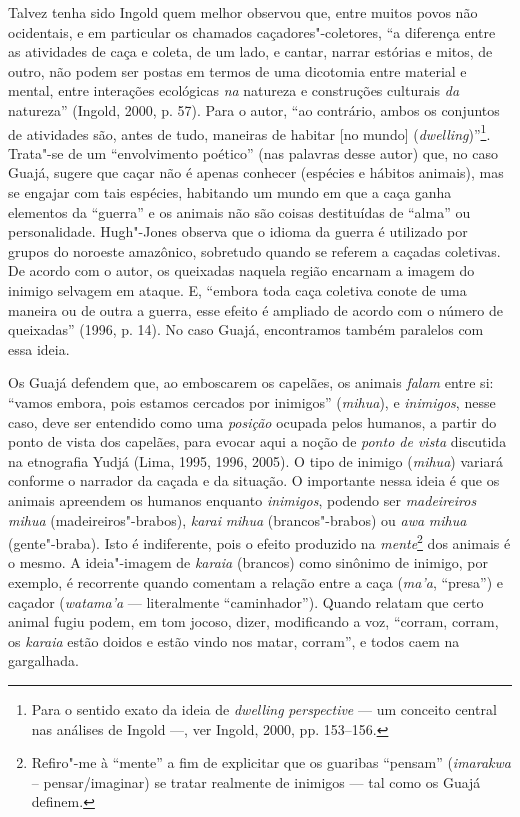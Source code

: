 Talvez tenha sido Ingold quem melhor observou que, entre muitos povos
não ocidentais, e em particular os chamados caçadores"-coletores, ``a
diferença entre as atividades de caça e coleta, de um lado, e cantar,
narrar estórias e mitos, de outro, não podem ser postas em termos de uma
dicotomia entre material e mental, entre interações ecológicas \emph{na}
natureza e construções culturais \emph{da} natureza'' (Ingold, 2000, p.
57). Para o autor, ``ao contrário, ambos os conjuntos de atividades são,
antes de tudo, maneiras de habitar {[}no mundo{]}
(\emph{dwelling})''\footnote{Para o sentido exato da ideia de
  \emph{dwelling} \emph{perspective} --- um conceito central nas análises
  de Ingold ---, ver Ingold, 2000, pp. 153--156.}. Trata"-se de um
``envolvimento poético'' (nas palavras desse autor) que, no caso Guajá,
sugere que caçar não é apenas conhecer (espécies e hábitos animais), mas
se engajar com tais espécies, habitando um mundo em que a caça ganha
elementos da ``guerra'' e os animais não são coisas destituídas de
``alma'' ou personalidade. Hugh"-Jones observa que o idioma da guerra é
utilizado por grupos do noroeste amazônico, sobretudo quando se referem
a caçadas coletivas. De acordo com o autor, os queixadas naquela região
encarnam a imagem do inimigo selvagem em ataque. E, ``embora toda caça
coletiva conote de uma maneira ou de outra a guerra, esse efeito é
ampliado de acordo com o número de queixadas'' (1996, p. 14). No caso
Guajá, encontramos também paralelos com essa ideia.

Os Guajá defendem que, ao emboscarem os capelães, os animais
\emph{falam} entre si: ``vamos embora, pois estamos cercados por
inimigos'' (\emph{mihua}), e \emph{inimigos}, nesse caso, deve ser
entendido como uma \emph{posição} ocupada pelos humanos, a partir do
ponto de vista dos capelães, para evocar aqui a noção de \emph{ponto de
vista} discutida na etnografia Yudjá (Lima, 1995, 1996, 2005). O tipo de
inimigo (\emph{mihua}) variará conforme o narrador da caçada e da
situação. O importante nessa ideia é que os animais apreendem os humanos
enquanto \emph{inimigos}, podendo ser \emph{madeireiros mihua}
(madeireiros"-brabos), \emph{karai} \emph{mihua} (brancos"-brabos) ou
\emph{awa} \emph{mihua} (gente"-braba). Isto é indiferente, pois o efeito
produzido na \emph{mente}\footnote{Refiro"-me à ``mente'' a fim de
  explicitar que os guaribas ``pensam'' (\emph{imarakwa} --
  pensar/imaginar) se tratar realmente de inimigos --- tal como os Guajá
  definem.} dos animais é o mesmo. A ideia"-imagem de \emph{karaia}
(brancos) como sinônimo de inimigo, por exemplo, é recorrente quando
comentam a relação entre a caça (\emph{ma'a}, ``presa'') e caçador
(\emph{watama'a} --- literalmente ``caminhador''). Quando relatam que certo
animal fugiu podem, em tom jocoso, dizer, modificando a voz, ``corram,
corram, os \emph{karaia} estão doidos e estão vindo nos matar, corram'',
e todos caem na gargalhada.

